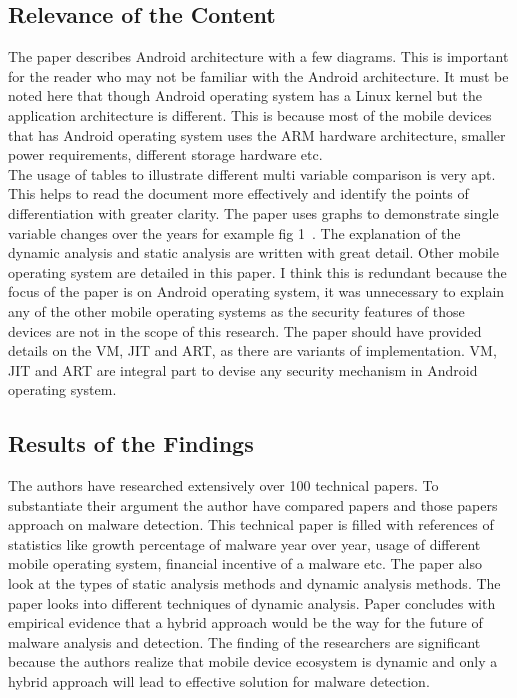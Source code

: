 \documentclass[12pt]{article}
\begin{document}
\subsection{Relevance of the Content}\label{ref:critique_motivation}
The paper describes Android architecture with a few diagrams. This is important for the reader who may not be familiar with the Android architecture. It must be noted here that though Android operating system has a Linux kernel but the application architecture is different. This is because most of the mobile devices that has Android operating system uses the ARM hardware architecture, smaller power requirements, different storage hardware etc.\\ 
The usage of tables to illustrate different multi variable comparison is very apt. This helps to read the document more effectively and identify the points of differentiation with greater clarity. The paper uses graphs to demonstrate single variable changes over the years for example fig 1~\cite{Tam:2017:EAM:3022634.3017427}. The explanation of the dynamic analysis and static analysis are written with great detail. Other mobile operating system are detailed in this paper. I think this is redundant because the focus of the paper is on Android operating system, it was unnecessary to explain any of the other mobile operating systems as the security features of those devices are not in the scope of this research. The paper should have provided details on the VM, JIT and ART, as there are variants of implementation. VM, JIT and ART are integral part to devise any security mechanism in Android operating system.

\subsection{Results of the Findings}\label{ref:critique_problem}
The authors have researched extensively over 100 technical papers. To substantiate their argument the author have compared papers and those papers approach on malware detection. This technical paper is filled with references of statistics like growth percentage of malware year over year, usage of different mobile operating system, financial incentive of a malware etc. The paper also look at the types of static analysis methods and dynamic analysis methods. The paper looks into different techniques of dynamic analysis. Paper concludes with empirical evidence that a hybrid approach would be the way for the future of malware analysis and detection. The finding of the researchers are significant because the authors realize that mobile device ecosystem is dynamic and only a hybrid approach will lead to effective solution for malware detection.
\end{document}
